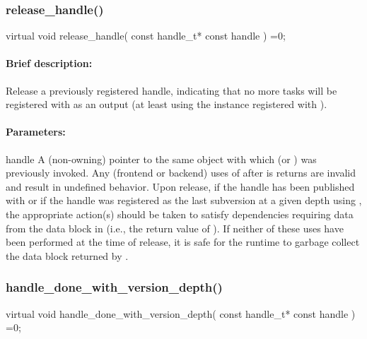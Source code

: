 \subsubsection{release\_handle()}
\begin{CppCode}
    virtual void
    release_handle(
      const handle_t* const handle
    ) =0;
\end{CppCode}

\paragraph{Brief description:} Release a previously registered handle, indicating that no more tasks will be registered
       with  as an output (at least using the instance registered with ).
     
\paragraph{Parameters:} 
\begin{compactdesc}
\item[handle] A (non-owning) pointer to the same object with which  (or
       ) was previously invoked.  Any (frontend or backend) uses of 
       after  is returns are invalid and result in undefined behavior.  Upon release,
       if the handle has been published with  or if the handle was registered
       as the last subversion at a given depth using , the
       appropriate action(s) should be taken to satisfy dependencies requiring data from the data block
       in  (i.e., the return value of ).  If neither of these uses have
       been performed at the time of release, it is safe for the runtime to garbage collect the data block
       returned by .
\end{compactdesc}


\subsubsection{handle\_done\_with\_version\_depth()}
\begin{CppCode}
    virtual void
    handle_done_with_version_depth(
      const handle_t* const handle
    ) =0;
\end{CppCode}

